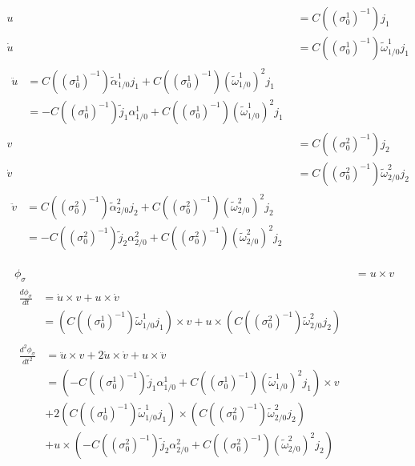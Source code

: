 \documentclass{article}
\begin{document}
\begin{align}
    u &= C((\sigma_0^1)^{-1})j_1 \\
    \dot{u} &= C((\sigma_0^1)^{-1})\tilde{\omega}_{1/0}^1j_1 \\
    \begin{split}
        \ddot{u} &= C((\sigma_0^1)^{-1})\tilde{\alpha}_{1/0}^1j_1 +
        C((\sigma_0^1)^{-1})(\tilde{\omega}_{1/0}^1)^2j_1 \\
        &= -C((\sigma_0^1)^{-1})\tilde{j}_1\alpha_{1/0}^1 +
        C((\sigma_0^1)^{-1})(\tilde{\omega}_{1/0}^1)^2j_1
    \end{split} \\
    v &= C((\sigma_0^2)^{-1})j_2 \\
    \dot{v} &= C((\sigma_0^2)^{-1})\tilde{\omega}_{2/0}^2j_2 \\
    \begin{split}
        \ddot{v} &= C((\sigma_0^2)^{-1})\tilde{\alpha}_{2/0}^2j_2 +
        C((\sigma_0^2)^{-1})(\tilde{\omega}_{2/0}^2)^2j_2 \\
        &= -C((\sigma_0^2)^{-1})\tilde{j}_2\alpha_{2/0}^2 +
        C((\sigma_0^2)^{-1})(\tilde{\omega}_{2/0}^2)^2j_2
    \end{split}
\end{align}

\begin{align}
    \phi_\sigma &= u\times v\\
    \begin{split}
        \frac{d\phi_\sigma}{dt} &= \dot{u}\times v + u \times\dot{v}
        \\&=
        (C((\sigma_0^1)^{-1})\tilde{\omega}_{1/0}^1j_1)\times v +
        u\times(C((\sigma_0^2)^{-1})\tilde{\omega}_{2/0}^2j_2)
    \end{split} \\
    \begin{split}
        \label{eqn:ddot_phi_sigma}
        \frac{d^2\phi_\sigma}{dt^2} &= \ddot{u}\times v + 2\dot{u}\times\dot{v} + u\times\ddot{v} \\
        &= (-C((\sigma_0^1)^{-1})\tilde{j}_1\alpha_{1/0}^1 +
        C((\sigma_0^1)^{-1})(\tilde{\omega}_{1/0}^1)^2j_1) \times v \\
        &+
        2(C((\sigma_0^1)^{-1})\tilde{\omega}_{1/0}^1j_1) \times
        (C((\sigma_0^2)^{-1})\tilde{\omega}_{2/0}^2j_2) \\
        &+ u\times(-C((\sigma_0^2)^{-1})\tilde{j}_2\alpha_{2/0}^2 +
        C((\sigma_0^2)^{-1})(\tilde{\omega}_{2/0}^2)^2j_2)
    \end{split}
\end{align}
\end{document}
